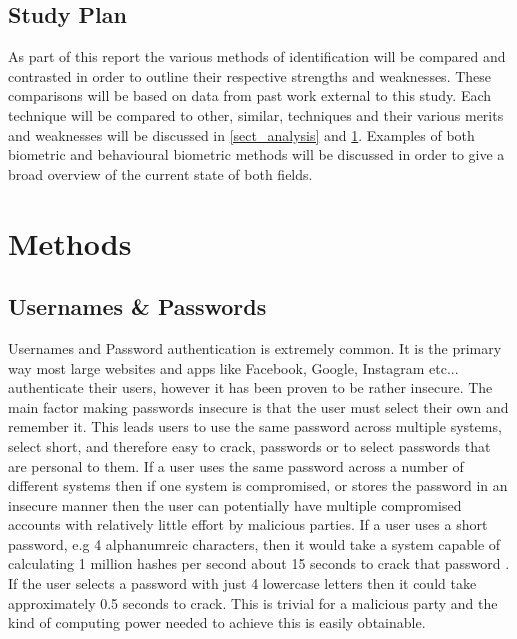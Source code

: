 \documentclass[12pt]{article}
\begin{document}
	\subsection{Study Plan}
	As part of this report the various methods of identification will be compared and contrasted in order to outline their respective strengths and weaknesses. These comparisons will be based on data from past work external to this study.
	Each technique will be compared to other, similar, techniques and their various merits and weaknesses will be discussed in \ref{sect_analysis} and \ref{sect_methods}.
	Examples of both biometric and behavioural biometric methods will be discussed in order to give a broad overview of the current state of both fields.
	
	\section{Methods}
	\label{sect_methods}
	\subsection{Usernames \& Passwords}
	Usernames and Password authentication is extremely common. It is the primary way most large websites and apps like Facebook, Google, Instagram etc... authenticate their users, however it has been proven to be rather insecure. The main factor making passwords insecure is that the user must select their own and remember it. This leads users to use the same password across multiple systems, select short, and therefore easy to crack, passwords or to select passwords that are personal to them.
	If a user uses the same password across a number of different systems then if one system is compromised, or stores the password in an insecure manner then the user can potentially have multiple compromised accounts with relatively little effort by malicious parties.
	If a user uses a short password, e.g 4 alphanumreic characters, then it would take a system capable of calculating 1 million hashes per second about 15 seconds to crack that password \citep{kessler1996passwords}. If the user selects a password with just 4 lowercase letters then it could take approximately 0.5 seconds to crack. This is trivial for a malicious party and the kind of computing power needed to achieve this is easily obtainable.
\end{document}
